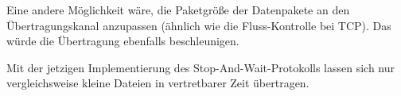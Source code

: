 \documentclass{article}
\begin{document}
	Eine andere Möglichkeit wäre, die Paketgröße der Datenpakete an den Übertragungskanal anzupassen (ähnlich wie die Fluss-Kontrolle bei TCP). Das würde die Übertragung ebenfalls beschleunigen.

	Mit der jetzigen Implementierung des Stop-And-Wait-Protokolls lassen sich nur vergleichsweise kleine Dateien in vertretbarer Zeit übertragen.
\end{document}
